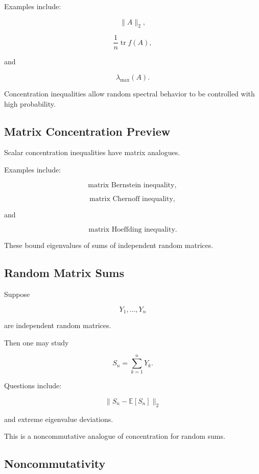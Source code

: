 Examples include:

\[
\boxed{
\|A\|_2,
}
\]

\[
\boxed{
\frac1n\operatorname{tr}f(A),
}
\]

and

\[
\boxed{
\lambda_{\max}(A).
}
\]

Concentration inequalities allow random spectral behavior to be
controlled with high probability.

\subsection{Matrix Concentration Preview}
\label{subsec:matrix-concentration-preview}

Scalar concentration inequalities have matrix analogues.

Examples include:

\[
\boxed{
\text{matrix Bernstein inequality},
}
\]

\[
\boxed{
\text{matrix Chernoff inequality},
}
\]

and

\[
\boxed{
\text{matrix Hoeffding inequality}.
}
\]

These bound eigenvalues of sums of independent random matrices.

\subsection{Random Matrix Sums}
\label{subsec:random-matrix-sums}

Suppose

\[
Y_1,\ldots,Y_n
\]

are independent random matrices.

Then one may study

\[
\boxed{
S_n
=
\sum_{k=1}^{n}Y_k.
}
\]

Questions include:

\[
\boxed{
\|S_n-\mathbb{E}[S_n]\|_2
}
\]

and extreme eigenvalue deviations.

This is a noncommutative analogue of concentration for random sums.

\subsection{Noncommutativity}
\label{subsec:rmt-noncommutativity}


